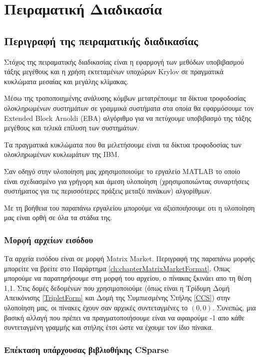 \chapter{Πειραματική Διαδικασία}
\label{ch:6.chapterImplementation}

\section{Περιγραφή της πειραματικής διαδικασίας}
Στόχος της πειραματικής διαδικασίας είναι η εφαρμογή των μεθόδων υποβιβασμού τάξης μεγέθους και η χρήση εκτεταμένων υποχώρων \textlatin{Krylov} σε πραγματικά κυκλώματα μεσαίας και μεγάλης κλίμακας. 

Μέσω της τροποποιημένης ανάλυσης κόμβων μετατρέπουμε τα δίκτυα τροφοδοσίας ολοκληρωμένων συστημάτων σε γραμμικά συστήματα στα οποία θα εφαρμόσουμε τον \textlatin{Extended Block Arnoldi (EBA)} αλγόριθμο για να πετύχουμε υποβιβασμό της τάξης μεγέθους και τελικά επίλυση των συστημάτων.

Τα πραγματικά κυκλώματα που θα μελετήσουμε είναι τα δίκτυα τροφοδοσίας των ολοκληρωμένων κυκλωμάτων της ΙΒΜ.

Σαν οδηγό στην υλοποίηση μας χρησιμοποιούμε το εργαλείο \textlatin{MATLAB} το οποίο είναι σχεδιασμένο για γρήγορη και άμεση υλοποίηση (χρησιμοποιώντας συναρτήσεις συστήματος για τις περισσότερες πράξεις μεταξύ πινάκων) αλγορίθμων.

Με τη βοήθεια του παραπάνω εργαλείου μπορούμε να αξιοποιήσουμε οτι η υλοποίηση μας είναι ορθή σε όλα τα στάδια της.

\subsection{Μορφή αρχείων εισόδου}
Τα αρχεία εισόδου είναι σε μορφή \textlatin{Matrix Market}. Περιγραφή της παραπάνω μορφής μπορείτε να βρείτε στο Παράρτημα \ref{ch:chapterMatrixMarketFormat}. Όπως μπορούμε να παρατηρήσουμε στη μορφή του αρχείου, ο πίνακας ξκινάει απο τη θέση 1,1. Στις δομές δεδομένων που χρησιμοποιούμε (όπως είναι η Τρίδυμη Δομή Απεικόνισης \ref{TripletForm} και Δομή της Συμπιεσμένης Στήλης \ref{CCS}) στην υλοποίηση μας, οι πίνακες έχουν σαν αρχικές συντεταγμένες το $(0,0)$. Συνεπώς, μια βασική αλλαγή που πρέπει να πραγματοποιήσουμε είναι να αφαιρούμε -1 απο κάθε συντεταγμένη γραμμής και στήλης έτσι ώστε να έχουμε τον ίδιο πίνακα.

\subsection{Επέκταση υπάρχουσας βιβλιοθήκης \textlatin{CSparse}}

